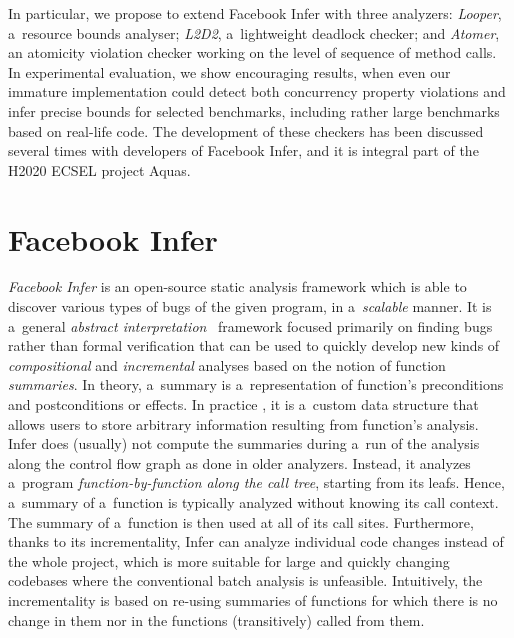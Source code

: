 \documentclass{ExcelAtFIT}
\begin{document}
In particular, we propose to extend Facebook Infer
with three analyzers: \emph{Looper}, a~resource
bounds analyser; \emph{L2D2}, a~lightweight
deadlock checker; and \emph{Atomer}, an atomicity
violation checker working on the level of sequence of
method calls. In experimental evaluation, we show
encouraging results, when even our immature
implementation could detect both concurrency
property violations and infer precise bounds for
selected benchmarks, including rather large
benchmarks based on real-life code. The development
of these checkers has been discussed several times
with developers of Facebook Infer, and it is integral
part of the H2020 ECSEL project Aquas.

\section{Facebook Infer}
\label{sec:infer}

\emph{Facebook Infer} is an open-source static
analysis framework which is able to discover
various types of bugs of the given program, in
a~\emph{scalable} manner.
It is a~general \emph{abstract
interpretation}~\cite{CousotCousot77-1} framework
focused primarily on finding bugs rather than
formal verification that can be used to quickly
develop new kinds of \emph{compositional} and
\emph{incremental} analyses based on the notion
of function \emph{summaries}. In theory, a~summary
is a~representation of function's preconditions and
postconditions or effects. In practice ,
it is a~custom data structure that allows
users to store arbitrary information resulting
from function's analysis. Infer does (usually) not
compute the summaries during a~run of the analysis
along the control flow graph as done in older
analyzers. Instead, it analyzes a~program
\emph{function-by-function along the call tree}, starting
from its leafs. Hence, a~summary of a~function is
typically analyzed without knowing its call context.
The summary of a~function is
then used at all of its call sites. Furthermore,
thanks to its incrementality, Infer can analyze
individual code changes instead of the whole project,
which is more suitable for large and quickly changing
codebases where the conventional batch analysis is
unfeasible. Intuitively, the incrementality is based
on re-using summaries of functions for which there is
no change in them nor in the functions (transitively)
called from them.
\end{document}
